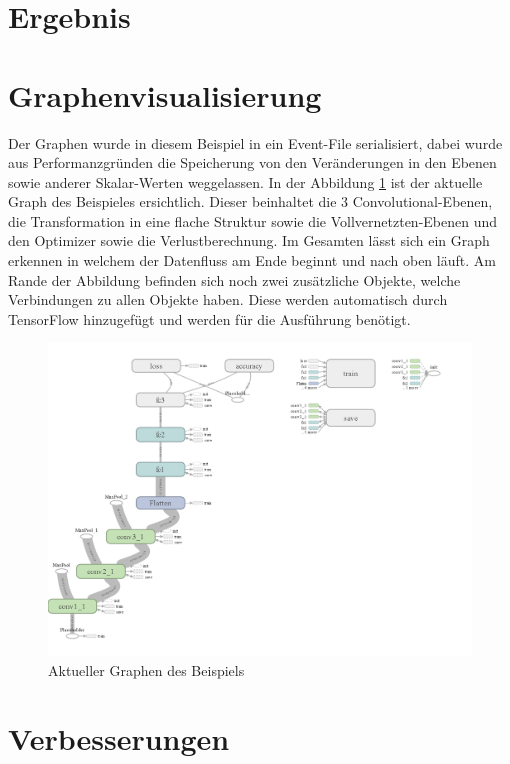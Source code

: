 \section{Ergebnis}

\section{Graphenvisualisierung}

Der Graphen wurde in diesem Beispiel in ein Event-File serialisiert, dabei wurde aus Performanzgründen die Speicherung von den Veränderungen in den Ebenen sowie anderer Skalar-Werten weggelassen. 
In der Abbildung \ref{fig:graphDig} ist der aktuelle Graph des Beispieles ersichtlich. 
Dieser beinhaltet die $3$ Convolutional-Ebenen, die Transformation in eine flache Struktur sowie die Vollvernetzten-Ebenen und den Optimizer sowie die Verlustberechnung. 
Im Gesamten lässt sich ein Graph erkennen in welchem der Datenfluss am Ende beginnt und nach oben läuft. 
Am Rande der Abbildung befinden sich noch zwei zusätzliche Objekte, welche Verbindungen zu allen Objekte haben. 
Diese werden automatisch durch TensorFlow hinzugefügt und werden für die Ausführung benötigt. 
\begin{figure}
	\centering
	\includegraphics[scale=0.28]{images/graph-run.png}
	\caption{Aktueller Graphen des Beispiels}
	\label{fig:graphDig}
\end{figure}

\section{Verbesserungen}

